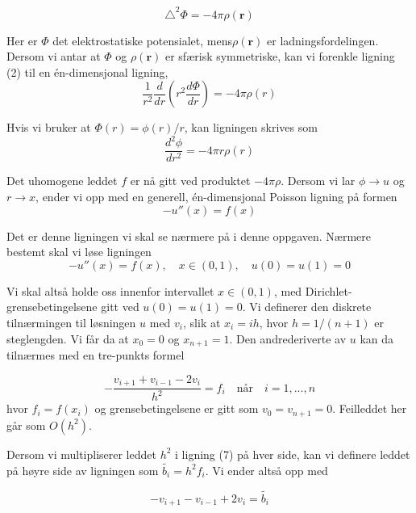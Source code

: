 \documentclass{article}
\begin{document}
\begin{equation}
\triangle^2 \Phi = -4\pi\rho(\textbf{r})
\end{equation}

Her er $\Phi$ det elektrostatiske potensialet, mens$\rho (\textbf{r})$ er ladningsfordelingen.
Dersom vi antar at $\Phi$ og $\rho(\textbf{r})$ er sfærisk symmetriske, kan vi forenkle ligning (2) til en én-dimensjonal ligning,
\begin{equation}
\frac{1}{r^2}\frac{d}{dr}\left(r^2\frac{d\Phi}{dr}\right) = -4\pi\rho(r)
\end{equation}

Hvis vi bruker at  $\Phi(r) = \phi(r)/r$, kan ligningen skrives som
\begin{equation}
\frac{d^2\phi}{dr^2} = -4\pi r\rho(r)
\end{equation}

Det uhomogene leddet $f$ er nå gitt ved produktet $-4\pi\rho$. Dersom vi lar $\phi \rightarrow u$ og $r \rightarrow x$, ender vi opp med en generell, én-dimensjonal Poisson ligning på formen 
\begin{equation}
-u''(x) = f(x)
\end{equation}

Det er denne ligningen vi skal se nærmere på i denne oppgaven. Nærmere bestemt skal vi løse ligningen
\begin{equation}
-u''(x) = f(x),\quad  x \in (0,1), \quad    u(0) = u(1) = 0
\end{equation}

Vi skal altså holde oss innenfor intervallet $x \in (0,1)$, med Dirichlet-grensebetingelsene gitt ved $u(0) = u(1) = 0$. Vi definerer den diskrete tilnærmingen til løsningen $u$ med $v_i$, slik at $x_i = ih$, hvor $h = 1/(n+1)$ er steglengden. Vi får da at $x_0 = 0$ og $x_{n+1} = 1$. Den andrederiverte av $u$ kan da tilnærmes med en tre-punkts formel

\begin{equation}
-\frac{v_{i+1} + v_{i-1} - 2v_i}{h^2} = f_i \quad \textrm{når} \quad i = 1,...,n
\end{equation}
hvor $f_i = f(x_i)$ og grensebetingelsene er gitt som $v_0 = v_{n+1} = 0$. Feilleddet her går som $O(h^2)$.

Dersom vi multipliserer leddet $h^2$ i ligning (7) på hver side, kan vi definere leddet på høyre side av ligningen som $\tilde{b_i} = h^2f_i$. Vi ender altså opp med 

\begin{equation}
- v_{i+1} - v_{i-1} + 2v_i = \tilde{b_i}
\end{equation}
\end{document}

